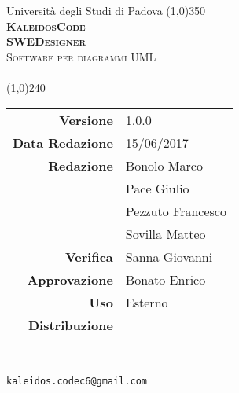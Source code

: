 \documentclass[a4paper,12pt]{article}
\author{KaleidosCode}
\date{15/06/2017}	%
\begin{document}
	\begin{titlepage}
		\centering Università degli Studi di Padova
		\line(1,0){350}\\
		\vspace{0.4cm}
		{\bfseries\scshape\LARGE KaleidosCode\\}
		\vspace{0.4cm}
		{\bfseries\scshape\LARGE SWEDesigner\\}
		{\scshape\Large Software per diagrammi UML\\}
		\vspace{1cm}
		{\scshape\Large {}\ \\}		%
		\vspace{1.4cm}
		\logo
		\vspace{1.2cm}
		\line(1,0){240}\\
		\begin{tabular}{r|l}
			{\hfill \textbf{Versione}} 			& 1.0.0\\
			{\hfill \textbf{Data Redazione}} 	& 15/06/2017\\	%
			{\hfill \textbf{Redazione}} 		& Bonolo Marco\\ & Pace Giulio\\ & Pezzuto Francesco\\ & Sovilla Matteo\\
			{\hfill \textbf{Verifica}} 			& Sanna Giovanni\\
			{\hfill \textbf{Approvazione}} 		& Bonato Enrico\\
			{\hfill \textbf{Uso}} 				& Esterno\\
			{\hfill \textbf{Distribuzione}} 	& \vardanega \\ & \cardin \\ & \proponente\\
		\end{tabular}\\
		\vspace{2cm}
		\texttt{kaleidos.codec6@gmail.com}
	\end{titlepage}

	\pagestyle{myfront}
	\newpage
		
	\newpage
		\tableofcontents
	\newpage
		\listoftables
	\newpage
		\listoffigures
		
	\newpage
	\pagestyle{mymain}
		
	\newpage
		
	\newpage
		
	\newpage
		
	\newpage
		
	\newpage
		
	\label{LastPage}
\end{document}
